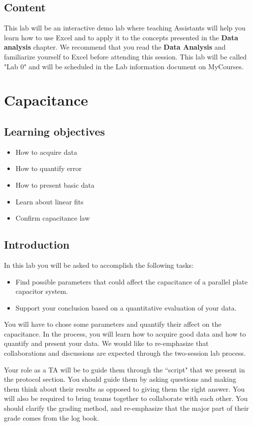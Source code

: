 \documentclass[12pt]{report}
\begin{document}
\section{Content}
This lab will be an interactive demo lab where teaching Assistants will help you  learn how to use Excel and to apply it to the concepts presented in the \textbf{Data analysis} chapter. We recommend that you read the \textbf{Data Analysis} and familiarize yourself to Excel before attending this session. This lab will be called "Lab 0" and will be scheduled in the Lab information document on MyCourses. 

\chapter{Capacitance}
\section{Learning objectives}
\begin{itemize}
\item How to acquire data
\item How to quantify error
\item How to present basic data
\item Learn about linear fits
\item Confirm capacitance law
\end{itemize}


\section{Introduction}
In this lab you will be asked to accomplish the following tasks:
\begin{itemize}
\item Find possible parameters that could affect the capacitance of a parallel plate capacitor system.
\item Support your conclusion based on a quantitative evaluation of your data.
\end{itemize}

You will have to chose some parameters and quantify their affect on the capacitance. In the process, you will learn how to acquire good data and how to quantify and present your data. We would like to re-emphasize that collaborations and discussions are expected through the two-session lab process.

\begin{tcolorbox}[title=Role as a TA]
Your role as a TA will be to guide them through the ``script" that we present in the protocol section. You should guide them by asking questions and making them think about their results as opposed to giving them the right answer. You will also be required to bring teams together to collaborate with each other. You should clarify the grading method, and re-emphasize that the major part of their grade comes from the log book.
\end{tcolorbox}
\end{document}
